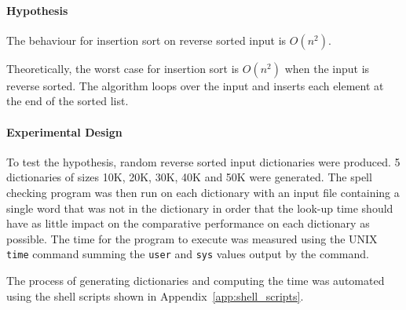 \documentclass[a4]{article}
\begin{document}
\paragraph{Hypothesis} The behaviour for insertion sort on reverse sorted input is $O(n^2)$.  

Theoretically, the worst case for insertion sort is $O(n^2)$ when the input is reverse sorted.  The algorithm loops over the input and inserts each element at the end of the sorted list.

\paragraph{Experimental Design} To test the hypothesis, random reverse sorted input dictionaries were produced. 5 dictionaries of sizes 10K, 20K, 30K, 40K and 50K were generated.  The spell checking program was then run on each dictionary with an input file containing a single word that was not in the dictionary in order that the look-up time should have as little impact on the comparative performance on each dictionary as possible.  The time for the program to execute was measured using the UNIX \texttt{time} command summing the \texttt{user} and \texttt{sys} values output by the command.  

The process of generating dictionaries and computing the time was automated using the shell scripts shown in Appendix~\ref{app:shell_scripts}.
\end{document}
